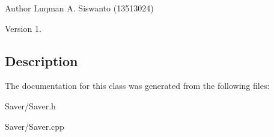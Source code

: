 \begin{DoxyAuthor}{Author}
Luqman A. Siswanto (13513024) 
\end{DoxyAuthor}
\begin{DoxyVersion}{Version}
1.
\end{DoxyVersion}
\hypertarget{class_logger_Description}{}\subsection{Description}\label{class_logger_Description}


The documentation for this class was generated from the following files\+:\begin{DoxyCompactItemize}
\item 
Saver/Saver.\+h\item 
Saver/Saver.\+cpp\end{DoxyCompactItemize}
